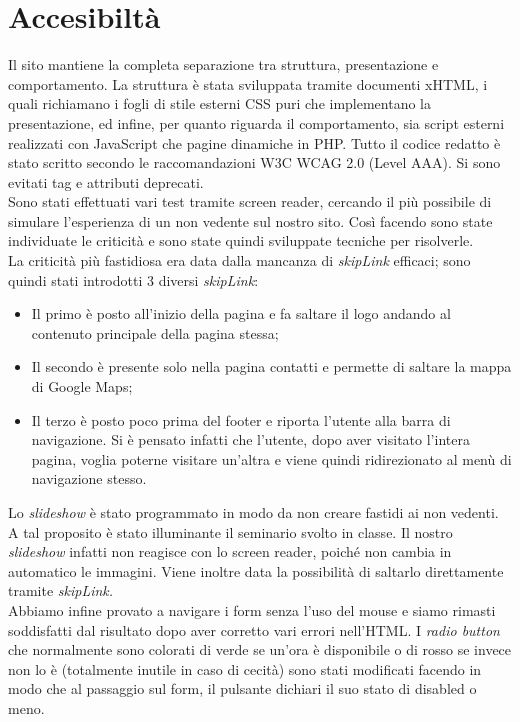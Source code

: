 \section{Accesibiltà}
Il sito mantiene la completa separazione tra struttura, presentazione e comportamento. La struttura è stata sviluppata tramite documenti xHTML, i quali richiamano i fogli di stile esterni CSS puri che implementano la presentazione, ed infine, per quanto riguarda il comportamento, sia script esterni realizzati con JavaScript che pagine dinamiche in PHP.
Tutto il codice redatto è stato scritto secondo le raccomandazioni W3C WCAG 2.0 (Level AAA).
Si sono evitati tag e attributi deprecati. \\


Sono stati effettuati vari test tramite screen reader, cercando il più possibile di simulare l’esperienza di un non vedente sul nostro sito. Così facendo sono state individuate le criticità e sono state quindi sviluppate tecniche per risolverle. \\


La criticità più fastidiosa era data dalla mancanza di \textit{skipLink} efficaci;
sono quindi stati introdotti 3 diversi \textit{skipLink}:
\begin{itemize}
\item Il primo è posto all’inizio della pagina e fa saltare il logo andando al contenuto principale della pagina stessa;
\item Il secondo è presente solo nella pagina contatti e permette di saltare la mappa di Google Maps;
\item Il terzo è posto poco prima del footer e riporta l’utente alla barra di navigazione. Si è pensato infatti che l’utente, dopo aver visitato l’intera pagina, voglia poterne visitare un’altra e viene quindi ridirezionato al menù di navigazione stesso. \\ 
\end{itemize}



Lo \textit{slideshow} è stato programmato in modo da non creare fastidi ai non vedenti. A tal proposito è stato illuminante il seminario svolto in classe.
Il nostro \textit{slideshow} infatti non reagisce con lo screen reader, poiché non cambia in automatico le immagini. Viene inoltre data la possibilità di saltarlo direttamente tramite \textit{skipLink.}\\


Abbiamo infine provato a navigare i form senza l’uso del mouse e siamo rimasti soddisfatti dal risultato dopo aver corretto vari errori nell’HTML.
I \textit{radio button} che normalmente sono colorati di verde se un’ora è disponibile o di rosso se invece non lo è (totalmente inutile in caso di cecità) sono stati modificati facendo in modo che al passaggio sul form, il pulsante dichiari il suo stato di disabled o meno.\\


